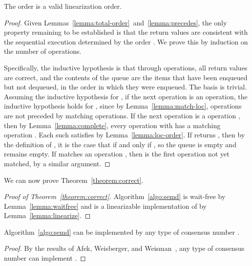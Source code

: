 \begin{lemma}
\label{lemma:linearize}
The order  is a valid linearization order. 
\end{lemma}
\begin{proof}
Given Lemmas~\ref{lemma:total-order}~and~\ref{lemma:precedes}, 
the only property remaining to be established 
is that the return values are consistent 
with the sequential execution determined by the order . 
We prove this by induction on the number of operations. 

Specifically, 
the inductive hypothesis is that through  operations, 
all return values are correct, 
and the contents of the queue 
are the items that have been enqueued but not dequeued, 
in the order in which they were enqueued. 
The basis  is trivial. 
Assuming the inductive hypothesis for , 
if the next operation is an  operation, 
the inductive hypothesis holds for , 
since by Lemma~\ref{lemma:match-loc}, 
 operations are not preceded 
by matching  operations. 
If the next operation is a  operation , 
then by Lemma~\ref{lemma:complete}, 
every  operation  with  
has a matching  operation . 
Each such  satisfies  
by Lemma~\ref{lemma:loc-order}. 
If  returns , 
then by the definition of , 
it is the case that  if and only if , 
so the queue is empty and remains empty. 
If  matches an  operation , 
then  is the first  operation not yet matched, 
by a similar argument. 
\end{proof}

We can now prove Theorem~\ref{theorem:correct}. 

\begin{proof}[Proof of Theorem~\ref{theorem:correct}]
Algorithm~\ref{algo:semd} is wait-free by Lemma~\ref{lemma:waitfree} 
and is a linearizable implementation of  by Lemma~\ref{lemma:linearize}. 
\end{proof}

\begin{theorem}
Algorithm~\ref{algo:semd} can be implemented by any type of consensus number . 
\end{theorem}
\begin{proof}
By the results of Afek, Weisberger, and Weisman~\cite{DBLP:journals/jal/AfekW99,DBLP:conf/podc/AfekWW92}, any type of consensus number  can implement . 
\end{proof}
